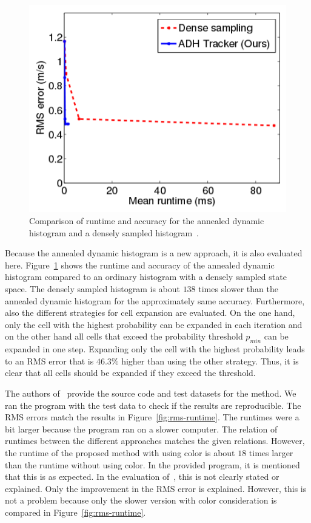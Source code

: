 \documentclass[twoside,a4paper,article]{combine}
\begin{document}
\begin{figure}
  \center
  \includegraphics[width=.5\linewidth]{adh-dense-time}
  \caption{Comparison of runtime and accuracy for the annealed dynamic
    histogram and a densely sampled histogram~\cite{paper}.}
  \label{fig:adh-vs-dense}
\end{figure}

Because the annealed dynamic histogram is a new approach, it is
also evaluated here. Figure~\ref{fig:adh-vs-dense} shows the runtime
and accuracy of the annealed dynamic histogram compared to an ordinary
histogram with a densely sampled state space. The densely sampled
histogram is about $138$ times slower than the annealed dynamic
histogram for the approximately same accuracy. Furthermore, also the
different strategies for cell expansion are evaluated. On the one
hand, only the cell with the highest probability can be expanded in
each iteration and on the other hand all cells that exceed the
probability threshold $p_{min}$ can be expanded in one step. Expanding
only the cell with the highest probability leads to an RMS error that
is $46.3\%$ higher than using the other strategy. Thus, it is clear that
all cells should be expanded if they exceed the threshold.

The authors of~\cite{paper} provide the source code and test datasets
for the method. We ran the program with the test data to check if the
results are reproducible. The RMS errors match the results in
Figure~\ref{fig:rms-runtime}. The runtimes were a bit larger because
the program ran on a slower computer. The relation of
runtimes between the different approaches matches the given
relations. However, the runtime of the proposed method with using
color is about $18$ times larger than the runtime without using
color. In the provided program, it is mentioned that this is as
expected. In the evaluation of~\cite{paper}, this is not clearly
stated or explained. Only the improvement in the RMS error is
explained. However, this is not a problem because only the slower version
with color consideration is compared in Figure~\ref{fig:rms-runtime}.
\end{document}
